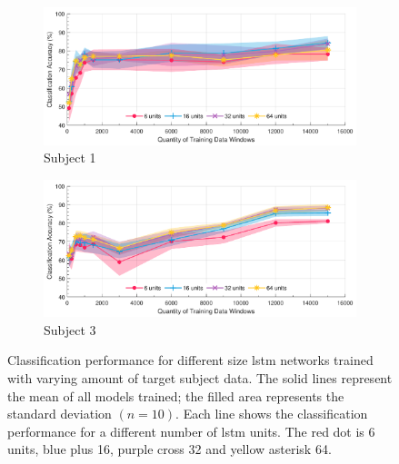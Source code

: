 \begin{figure}[p]
    \centering
    \begin{subfigure}[b]{\textwidth}
        \centering
        \includegraphics[width=\textwidth]{content/5-Personalisation/Bespoke_Target/ch5_bespoke_target_model_subject_1.pdf}
        \caption{Subject 1}
        \label{fig:ch5_6_unit_bespoke_model}
    \end{subfigure}
    \begin{subfigure}[b]{\textwidth}
        \centering
        \includegraphics[width=\textwidth]{content/5-Personalisation/Bespoke_Target/ch5_bespoke_target_model_subject_3.pdf}
        \caption{Subject 3}
        \label{fig:ch5_16_unit_bespoke_model}
    \end{subfigure}
    \caption[Classification performance for different size  networks trained with varying amount of target subject data]{Classification performance for different size \acrshort{lstm} networks trained with varying amount of target subject data. The solid lines represent the mean of all models trained; the filled area represents the standard deviation $(n=10)$. Each line shows the classification performance for a different number of \acrshort{lstm} units. The red dot is 6 units, blue plus 16, purple cross 32 and yellow asterisk 64.
}
    \label{fig:ch5_bespoke_mode_classification}
\end{figure}

